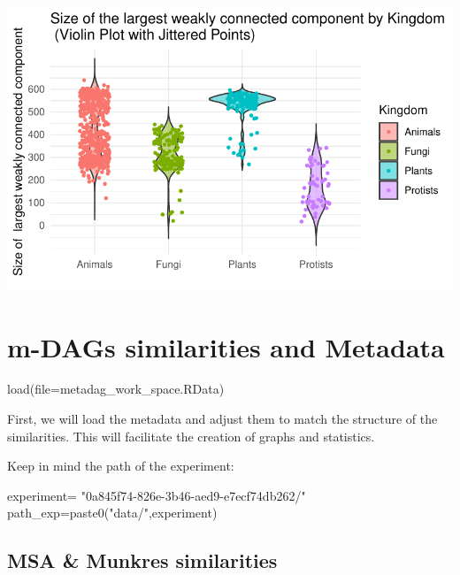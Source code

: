 \documentclass[
  letterpaper,
  DIV=11,
  numbers=noendperiod]{scrreprt}
\newenvironment{Shaded}{}{}
\newcommand{\AttributeTok}[1]{\textcolor[rgb]{0.78,0.47,0.87}{#1}}
\newcommand{\FunctionTok}[1]{\textcolor[rgb]{0.38,0.69,0.94}{#1}}
\newcommand{\NormalTok}[1]{\textcolor[rgb]{0.67,0.70,0.75}{#1}}
\newcommand{\OtherTok}[1]{\textcolor[rgb]{0.15,0.68,0.38}{#1}}
\newcommand{\StringTok}[1]{\textcolor[rgb]{0.60,0.76,0.47}{#1}}
\begin{document}
\includegraphics[width=1\textwidth,height=\textheight]{metabolic_graphs_files/figure-pdf/unnamed-chunk-21-1.pdf}


\chapter{m-DAGs similarities and
Metadata}\label{m-dags-similarities-and-metadata}

\begin{Shaded}
\begin{Highlighting}[]
\FunctionTok{load}\NormalTok{(}\AttributeTok{file=}\StringTok{\textquotesingle{}metadag\_work\_space.RData\textquotesingle{}}\NormalTok{)}
\end{Highlighting}
\end{Shaded}

First, we will load the metadata and adjust them to match the structure
of the similarities. This will facilitate the creation of graphs and
statistics.

Keep in mind the path of the experiment:

\begin{Shaded}
\begin{Highlighting}[]
\NormalTok{experiment}\OtherTok{=}
  \StringTok{"0a845f74{-}826e{-}3b46{-}aed9{-}e7ecf74db262/"}
\NormalTok{path\_exp}\OtherTok{=}\FunctionTok{paste0}\NormalTok{(}\StringTok{"data/"}\NormalTok{,experiment)}
\end{Highlighting}
\end{Shaded}

\section{MSA \& Munkres similarities}\label{msa-munkres-similarities}
\end{document}
